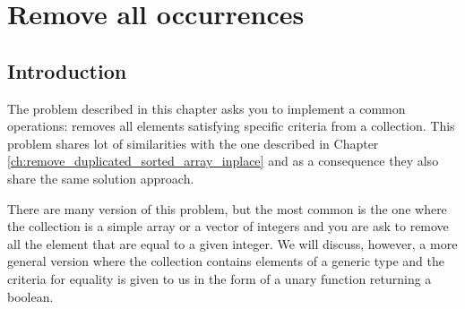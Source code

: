 %



\chapter{Remove all occurrences}
\label{ch:remove_all_occurrences_unsorted_array_inplace}
\section*{Introduction}
The problem described in this chapter asks you to implement a common operations: 
removes all elements satisfying specific criteria from a collection.
This problem shares  lot of similarities with the one described in Chapter \ref{ch:remove_duplicated_sorted_array_inplace}
and as a consequence they also share the same solution approach. 

There are many version of this problem, but the most  common is
the one where the collection is a simple array or a vector of integers
and you are ask to remove all the element that are equal to a given integer.
We will discuss, however, a more general version where the collection contains elements of a generic type 
and the criteria for equality is given to us in the form of a unary function returning a boolean.

